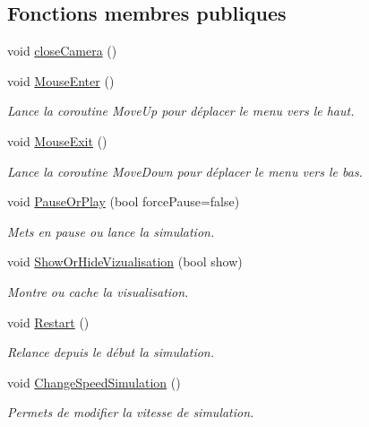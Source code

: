\subsection*{Fonctions membres publiques}
\begin{DoxyCompactItemize}
\item 
void \mbox{\hyperlink{class_menu_visualization_u_i_a111cf59e821c16b45f21ed35339e70d3}{close\+Camera}} ()
\item 
void \mbox{\hyperlink{class_menu_visualization_u_i_ade48d2d4dd652f9f693072bf3d6a5c1c}{Mouse\+Enter}} ()
\begin{DoxyCompactList}\small\item\em Lance la coroutine Move\+Up pour déplacer le menu vers le haut. \end{DoxyCompactList}\item 
void \mbox{\hyperlink{class_menu_visualization_u_i_a47ce6ce3497846e9048582985fc3d8be}{Mouse\+Exit}} ()
\begin{DoxyCompactList}\small\item\em Lance la coroutine Move\+Down pour déplacer le menu vers le bas. \end{DoxyCompactList}\item 
void \mbox{\hyperlink{class_menu_visualization_u_i_a9affc75173b7b9e70340b2b934398464}{Pause\+Or\+Play}} (bool force\+Pause=false)
\begin{DoxyCompactList}\small\item\em Mets en pause ou lance la simulation. \end{DoxyCompactList}\item 
void \mbox{\hyperlink{class_menu_visualization_u_i_ab06398a58bc8438ead7172d9e09b8bca}{Show\+Or\+Hide\+Vizualisation}} (bool show)
\begin{DoxyCompactList}\small\item\em Montre ou cache la visualisation. \end{DoxyCompactList}\item 
void \mbox{\hyperlink{class_menu_visualization_u_i_ad71bfeae87aee9f53387e7abf59040c4}{Restart}} ()
\begin{DoxyCompactList}\small\item\em Relance depuis le début la simulation. \end{DoxyCompactList}\item 
void \mbox{\hyperlink{class_menu_visualization_u_i_abae4f4813543053bd5fc9d68ed4916d5}{Change\+Speed\+Simulation}} ()
\begin{DoxyCompactList}\small\item\em Permets de modifier la vitesse de simulation. \end{DoxyCompactList}\item 

\end{DoxyCompactItemize}
